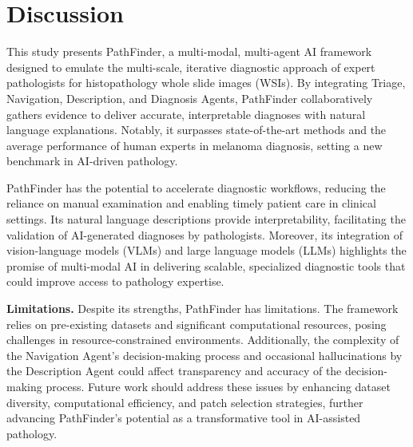 \section{Discussion}

This study presents PathFinder, a multi-modal, multi-agent AI framework designed to emulate the multi-scale, iterative diagnostic approach of expert pathologists for histopathology whole slide images (WSIs). By integrating Triage, Navigation, Description, and Diagnosis Agents, PathFinder collaboratively gathers evidence to deliver accurate, interpretable diagnoses with natural language explanations. Notably, it surpasses state-of-the-art methods and the average performance of human experts in melanoma diagnosis, setting a new benchmark in AI-driven pathology.

PathFinder has the potential to accelerate diagnostic workflows, reducing the reliance on manual examination and enabling timely patient care in clinical settings. Its natural language descriptions provide interpretability, facilitating the validation of AI-generated diagnoses by pathologists. Moreover, its integration of vision-language models (VLMs) and large language models (LLMs) highlights the promise of multi-modal AI in delivering scalable, specialized diagnostic tools that could improve access to pathology expertise.

\noindent\textbf{Limitations.} Despite its strengths, PathFinder has limitations. The framework relies on pre-existing datasets and significant computational resources, posing challenges in resource-constrained environments. Additionally, the complexity of the Navigation Agent’s decision-making process and occasional hallucinations by the Description Agent could affect transparency and accuracy of the decision-making process. Future work should address these issues by enhancing dataset diversity, computational efficiency, and patch selection strategies, further advancing PathFinder's potential as a transformative tool in AI-assisted pathology.

